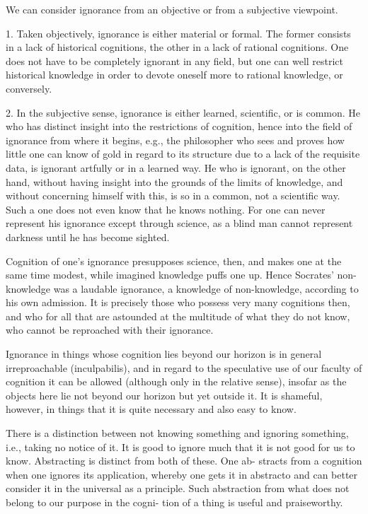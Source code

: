 We can consider ignorance from an objective or from a subjective viewpoint.

1. Taken objectively, ignorance is either material or formal.
The former consists in a lack of historical cognitions,
the other in a lack of rational cognitions.
One does not have to be completely ignorant in any field,
but one can well restrict historical knowledge in order to
devote oneself more to rational knowledge, or conversely.

2. In the subjective sense, ignorance is either learned, scientific, or is common.
He who has distinct insight into the restrictions of cognition,
hence into the field of ignorance from where it begins,
e.g., the philosopher who sees and proves how little one can know of
gold in regard to its structure due to a lack of the requisite data,
is ignorant artfully or in a learned way.
He who is ignorant, on the other hand, without
having insight into the grounds of the limits of knowledge,
and without concerning himself with this, is so in a common, not a scientific way.
Such a one does not even know that he knows nothing.
For one can never represent his ignorance except through science,
as a blind man cannot represent darkness until he has become sighted.

Cognition of one's ignorance presupposes science, then, and
makes one at the same time modest, while imagined knowledge puffs one up.
Hence Socrates' non-knowledge was a laudable ignorance,
a knowledge of non-knowledge, according to his own admission.
It is precisely those who possess very many cognitions then, and
who for all that are astounded at the multitude of what they do not know,
who cannot be reproached with their ignorance.

Ignorance in things whose cognition lies beyond our horizon is in
general irreproachable (inculpabilis), and in regard to the speculative use of
our faculty of cognition it can be allowed (although only in the relative
sense), insofar as the objects here lie not beyond our horizon but yet outside
it. It is shameful, however, in things that it is quite necessary and also easy
to know.

There is a distinction between not knowing something and ignoring
something, i.e., taking no notice of it. It is good to ignore much that it is not
good for us to know. Abstracting is distinct from both of these. One ab-
stracts from a cognition when one ignores its application, whereby one
gets it in abstracto and can better consider it in the universal as a principle.
Such abstraction from what does not belong to our purpose in the cogni-
tion of a thing is useful and praiseworthy.

